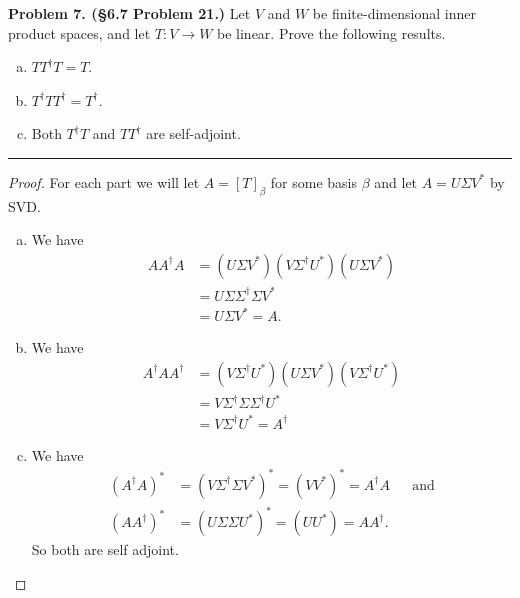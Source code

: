 \documentclass[leqno]{article}
\theoremstyle{nonumberplain}
\newtheorem{proof}{Proof}
\begin{document}
\noindent\textbf{Problem 7. (\S 6.7 Problem 21.)} Let $V$ and $W$ be finite-dimensional inner product spaces, and let $T\colon V \to W$ be linear. Prove the following results.
\begin{enumerate}[(a)]
\item $TT^\dagger T = T$.
\item $T^\dagger TT^\dagger=T^\dagger$.
\item Both $T^\dagger T$ and $TT^\dagger$ are self-adjoint.
\end{enumerate}

\noindent\rule[0.5ex]{\linewidth}{1pt}

\begin{proof}
For each part we will let $A=[T]_\beta$ for some basis $\beta$ and let $A=U\Sigma V^*$ by SVD.
\begin{enumerate}[(a)]
\item We have 
\begin{align*}
AA^\dagger A&= (U\Sigma V^*)(V\Sigma^\dagger U^*)(U\Sigma V^*)\\
&= U\Sigma \Sigma^\dagger \Sigma V^*\\
&= U\Sigma V^*=A.
\end{align*}
\item We have
\begin{align*}
A^\dagger A A^\dagger &= (V\Sigma^\dagger U^*)(U\Sigma V^*)(V\Sigma^\dagger U^*)\\
&= V\Sigma^\dagger \Sigma \Sigma^\dagger U^*\\
&= V\Sigma^\dagger U^*=A^\dagger
\end{align*}
\item We have
\begin{align*}
(A^\dagger A)^*&=(V\Sigma^\dagger \Sigma V^*)^*= (VV^*)^*=A^\dagger A &&\textrm{and}\\
(AA^\dagger)^* &=(U\Sigma \Sigma U^*)^*=(UU^*)=AA^\dagger.
\end{align*}
So both are self adjoint.
\end{enumerate}

\end{proof}

\pagebreak
\end{document}
